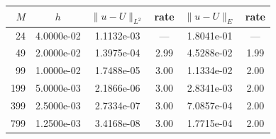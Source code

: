 \begin{tabular}{rccccc}
\toprule
$M$ & $h$ & $\|u-U\|_{L^2}$ & rate & $\|u-U\|_E$ & rate\\
\midrule
24 & 4.0000e-02 & 1.1132e-03 & --- & 1.8041e-01 & ---\\
49 & 2.0000e-02 & 1.3975e-04 & 2.99 & 4.5288e-02 & 1.99\\
99 & 1.0000e-02 & 1.7488e-05 & 3.00 & 1.1334e-02 & 2.00\\
199 & 5.0000e-03 & 2.1866e-06 & 3.00 & 2.8341e-03 & 2.00\\
399 & 2.5000e-03 & 2.7334e-07 & 3.00 & 7.0857e-04 & 2.00\\
799 & 1.2500e-03 & 3.4168e-08 & 3.00 & 1.7715e-04 & 2.00\\
\bottomrule
\end{tabular}
